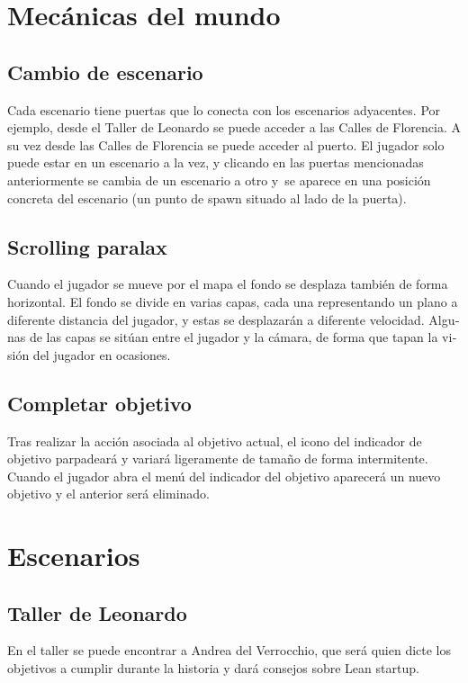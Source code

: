 \section[Mec\'anicas del mundo]{ Mec\'anicas del mundo}
\hypertarget{Toc484614254}{}\subsection[Cambio de escenario]{ Cambio de escenario}
\hypertarget{Toc484614255}{}{
Cada escenario tiene puertas que lo conecta con los escenarios adyacentes. Por ejemplo, desde el Taller de Leonardo se
puede acceder a las Calles de Florencia. A su vez desde las Calles de Florencia se puede acceder al puerto. El jugador
solo puede estar en un escenario a la vez, y clicando en las puertas mencionadas anteriormente se cambia de un
escenario a otro y\ se aparece en una posici\'on concreta del escenario (un punto de spawn situado al lado de la
puerta).}

\subsection[Scrolling paralax]{ Scrolling paralax}
\hypertarget{Toc484614256}{}{
\foreignlanguage{spanish}{Cuando el jugador se mueve por el mapa el fondo se desplaza tambi\'en de forma horizontal. El
fondo se divide en varias capas, cada una representando un plano a diferente distancia del jugador, y estas se
desplazar\'an a diferente velocidad. Algunas de las capas se sit\'uan entre el jugador y la c\'amara, de forma que
tapan la visi\'on del jugador en ocasiones.}}

\subsection[Completar objetivo]{ Completar objetivo}
\hypertarget{Toc484614257}{}{
Tras realizar la acci\'on asociada al objetivo actual, el icono del indicador de objetivo parpadear\'a y variar\'a
ligeramente de tama\~no de forma intermitente. Cuando el jugador abra el men\'u del indicador del objetivo aparecer\'a
un nuevo objetivo y el anterior ser\'a eliminado.}

\section[Escenarios]{ Escenarios}
\label{descripcionEscenarios}
\hypertarget{Toc484614258}{}\subsection[Taller de Leonardo]{ Taller de Leonardo}
\hypertarget{Toc484614259}{}{
En el taller se puede encontrar a Andrea del Verrocchio, que ser\'a quien dicte los objetivos a cumplir durante la
historia y dar\'a consejos sobre Lean startup.}

